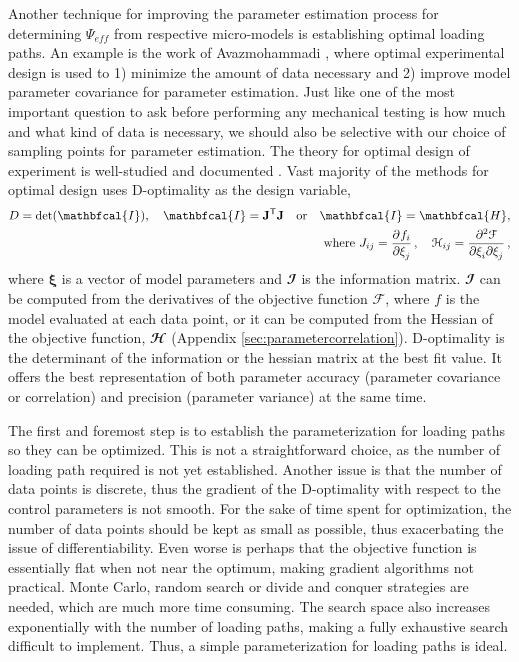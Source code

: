 	Another technique for improving the parameter estimation process for determining $\Psi_{eff}$ from respective micro-models is establishing optimal loading paths. An example is the work of Avazmohammadi \cite{avazmohammadi_novel_2016}, where optimal experimental design is used to 1) minimize the amount of data necessary and 2) improve model parameter covariance for parameter estimation. Just like one of the most important question to ask before performing any mechanical testing is how much and what kind of data is necessary, we should also be selective with our choice of sampling points for parameter estimation. The theory for optimal design of experiment is well-studied and documented \cite{lanir_optimal_1996, zhu_d_2014}. Vast majority of the methods for optimal design uses D-optimality as the design variable,
\begin{equation}\label{eqn:doptimality}
\begin{aligned}
D = \det(\mathbfcal{I}), \quad \mathbfcal{I} = \mathbf{J}^\mathsf{T}\mathbf{J} \quad \mathrm{or} \quad \mathbfcal{I} = \mathbfcal{H},	\\
\mathrm{where} \ J_{ij} = \dpd{f_i}{\xi_j}, \quad \mathcal{H}_{ij} = \dmd{\mathcal{F}}{2}{\xi_i}{}{\xi_j}{},
\end{aligned}
\end{equation}
    where $\mathbf{\xi}$ is a vector of model parameters and $\mathbfcal{I}$ is the information matrix. $\mathbfcal{I}$ can be computed from the derivatives of the objective function $\mathcal{F}$, where $f$ is the model evaluated at each data point, or it can be computed from the Hessian of the objective function, $\mathbfcal{H}$ (Appendix \ref{sec:parametercorrelation}). D-optimality is the determinant of the information or the hessian matrix at the best fit value. It offers the best representation of both parameter accuracy (parameter covariance or correlation) and precision (parameter variance) at the same time.

    
    The first and foremost step is to establish the parameterization for loading paths so they can be optimized. This is not a straightforward choice, as the number of loading path required is not yet established. Another issue is that the number of data points is discrete, thus the gradient of the D-optimality with respect to the control parameters is not smooth. For the sake of time spent for optimization, the number of data points should be kept as small as possible, thus exacerbating the issue of differentiability. Even worse is perhaps that the objective function is essentially flat when not near the optimum, making gradient algorithms not practical. Monte Carlo, random search or divide and conquer strategies are needed, which are much more time consuming. The search space also increases exponentially with the number of loading paths, making a fully exhaustive search difficult to implement. Thus, a simple parameterization for loading paths is ideal. 
    

